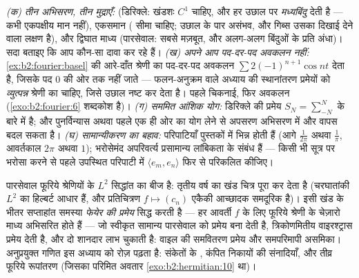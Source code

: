 \begin{remark}[सामान्य भूलें]
\emph{(क) तीन अभिसरण, तीन मुद्राएँ:}  (डिरिक्ले: खंडशः $C^1$
चाहिए, और हर उछाल पर \emph{मध्यबिंदु} देती है --- कभी एकपक्षीय मान नहीं),
एकसमान ( सीमा चाहिए; उछाल के पार असंभव, और गिब्स उसका दिखाई देने
वाला लक्षण है), और द्विघात माध्य (पारसेवाल: सबसे मज़बूत, और अलग-अलग
बिंदुओं के प्रति अंधा)। सदा बताइए कि आप कौन-सा दावा कर रहे हैं। \emph{(ख)
अपने आप पद-दर-पद अवकलन नहीं:} \cref{ex:b2:fourier:basel} की आरे-दाँत श्रेणी का पद-दर-पद अवकलन
$\sum
2(-1)^{n+1}\cos nt$ देता है, जिसके पद $0$ की ओर तक नहीं जाते --- फलन-अनुक्रम वाले अध्याय
की स्थानांतरण प्रमेयों को \emph{व्युत्पन्न} श्रेणी का  चाहिए,
जिसे उछाल नष्ट कर देता है। पहले चिकनाई, फिर अवकलन (\cref{exo:b2:fourier:6} शब्दकोश है)।
\emph{(ग) सममित आंशिक योग:} डिरिक्ले की प्रमेय $S_N =
\sum_{-N}^{N}$ के बारे में है; और
पुनर्विन्यास अथवा पहले एक ही ओर का योग लेने से अपसरण अभिसरण में और वापस
बदल सकता है। \emph{(घ) सामान्यीकरण का बहाव:} परिपाटियाँ पुस्तकों में
भिन्न होती हैं (आगे $\frac{1}{2\pi}$ अथवा $\frac1\pi$, आवर्तकाल $2\pi$ अथवा $1$); भरोसेमंद
अपरिवर्त्य प्रसामान्य लांबिकता के संबंध हैं --- किसी भी सूत्र पर भरोसा
करने से पहले उपस्थित परिपाटी में $\langle e_m, e_n\rangle$ फिर से परिकलित कीजिए।
\end{remark}

\begin{remark}[यह कहाँ काम आता है]
पारसेवाल फूरिये श्रेणियों के $L^2$ सिद्धांत का बीज है: तृतीय वर्ष का खंड
चित्र पूरा कर देता है (चरघातांकी $L^2$ का हिल्बर्ट आधार हैं, और प्रतिचित्रण
$f \mapsto (c_n)$ एकैकी आच्छादक समदूरिक है)। इसी खंड के भीतर सप्ताहांत समस्या
\emph{फेयेर की प्रमेय} सिद्ध करती है --- हर  आवर्ती $f$ के लिए फूरिये
श्रेणी के चेज़ारो माध्य  अभिसरित होते हैं --- जो स्वीकृत
सामान्य पारसेवाल को प्रमेय बना देती है, त्रिकोणमितीय वाइरश्ट्रास प्रमेय
देती है, और दो शानदार लाभ चुकाती है: वाइल की समवितरण प्रमेय और समपरिमापी
असमिका। अनुप्रयुक्त गणित इस अध्याय को रोज़ पढ़ता है: संकेतों के ,
कंपित निकायों की संनादियाँ, और तीव्र फूरिये रूपांतरण (जिसका परिमित अवतार
\cref{exo:b2:hermitian:10} था)।
\end{remark}


